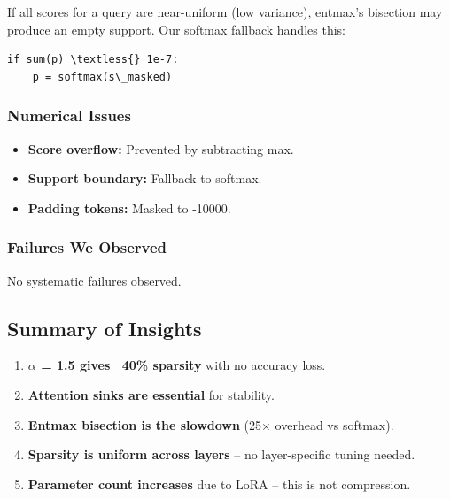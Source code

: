 If all scores for a query are near-uniform (low variance), entmax's bisection 
may produce an empty support. Our softmax fallback handles this:

\begin{lstlisting}
if sum(p) \textless{} 1e-7:
    p = softmax(s\_masked)
\end{lstlisting}

\subsubsection{Numerical Issues}

\begin{itemize}
\item \textbf{Score overflow:} Prevented by subtracting max.
\item \textbf{Support boundary:} Fallback to softmax.
\item \textbf{Padding tokens:} Masked to -10000.

\end{itemize}
\subsubsection{Failures We Observed}

No systematic failures observed.

\subsection{Summary of Insights}

\begin{enumerate}
\item \textbf{$\alpha$ = 1.5 gives ~40\% sparsity} with no accuracy loss.
\item \textbf{Attention sinks are essential} for stability.
\item \textbf{Entmax bisection is the slowdown} (25$\times$ overhead vs softmax).
\item \textbf{Sparsity is uniform across layers} -- no layer-specific tuning needed.
\item \textbf{Parameter count increases} due to LoRA -- this is not compression.
\end{enumerate}